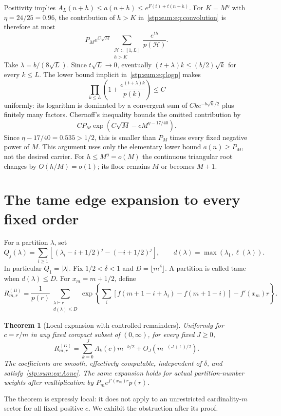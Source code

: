 \documentclass[11pt]{article}
\newtheorem{theorem}{Theorem}[section]
\theoremstyle{remark}\newtheorem{remark}[theorem]{Remark}
\newcommand{\cH}{\mathcal H}
\begin{document}
Positivity implies $A_L(n+h)\le a(n+h)\le e^{F(t)+t(n+h)}$. For $K=M^\eta$ with $\eta=24/25=0.96$, the contribution of $h>K$ in~\eqref{stp:sum:eq:convolution} is therefore at most
\[
 P_Me^{C\sqrt M}\sum_{\substack{\cH\subset[1,L]\\h>K}}
       \frac{e^{th}}{p(\cH)}.
\]
Take $\lambda=b/(8\sqrt L)$. Since $t\sqrt L\to0$, eventually $(t+\lambda)k\le (b/2)\sqrt k$ for every $k\le L$. The lower bound implicit in~\eqref{stp:sum:eq:logp} makes
\[
 \prod_{k\le L}\left(1+\frac{e^{(t+\lambda)k}}{p(k)}\right)\le C
\]
uniformly: its logarithm is dominated by a convergent sum of $Ck e^{-b\sqrt k/2}$ plus finitely many factors. Chernoff's inequality bounds the omitted contribution by
\begin{equation}\label{stp:sum:eq:initialtail}
 CP_M\exp(C\sqrt M-cM^{\eta-17/40}).
\end{equation}
Since $\eta-17/40=0.535>1/2$, this is smaller than $P_M$ times every fixed negative power of $M$. This argument uses only the elementary lower bound $a(n)\ge P_M$, not the desired carrier. For $h\le M^\eta=o(M)$ the continuous triangular root changes by $O(h/M)=o(1)$; its floor remains $M$ or becomes $M+1$.

\section{The tame edge expansion to every fixed order}
\label{stp:sum:sec:local}
For a partition $\lambda$, set
\begin{equation}\label{stp:sum:eq:Qj}
 Q_j(\lambda)=\sum_{i\ge1}\left[(\lambda_i-i+1/2)^j-(-i+1/2)^j\right],
 \qquad d(\lambda)=\max(\lambda_1,\ell(\lambda)).
\end{equation}
In particular $Q_1=|\lambda|$. Fix $1/2<\delta<1$ and $D=\lfloor m^\delta\rfloor$. A partition is called tame when $d(\lambda)\le D$. For $x_m=m+1/2$, define
\[
 R_{m,r}^{(D)}=\frac1{p(r)}\sum_{\substack{\lambda\vdash r\\d(\lambda)\le D}}
 \exp\left\{\sum_i[f(m+1-i+\lambda_i)-f(m+1-i)]-f'(x_m)r\right\}.
\]

\begin{theorem}[Local expansion with controlled remainders]\label{stp:sum:thm:local}
Uniformly for $c=r/m$ in any fixed compact subset of $(0,\infty)$, for every fixed $J\ge0$,
\begin{equation}\label{stp:sum:eq:local}
 R_{m,r}^{(D)}=\sum_{k=0}^J A_k(c)m^{-k/2}+O_J(m^{-(J+1)/2}).
\end{equation}
The coefficients are smooth, effectively computable, independent of $\delta$, and satisfy~\eqref{stp:sum:eq:Aone}. The same expansion holds for actual partition-number weights after multiplication by $P_m e^{f'(x_m)r}p(r)$.
\end{theorem}
The theorem is expressly local: it does not apply to an unrestricted cardinality-$m$ sector for all fixed positive $c$. We exhibit the obstruction after its proof.
\end{document}
